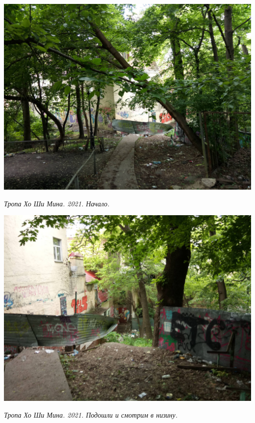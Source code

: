 \begin{center}
\includegraphics[width=\linewidth]{rpix/IMG_20210601_134915.jpg}

\textit{Тропа Хо Ши Мина. 2021. Начало.}
\end{center}



\begin{center}
\includegraphics[width=\linewidth]{rpix/IMG_20210601_134927.jpg}

\textit{Тропа Хо Ши Мина. 2021. Подошли и смотрим в низину.}
\end{center}



